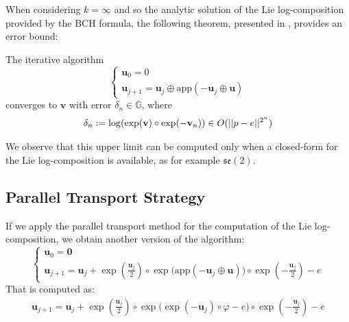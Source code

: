 When considering $k = \infty$ and so the analytic solution of the Lie log-composition provided by the BCH formula, the following theorem, presented in \cite{Bossa:08}, provides an error bound:
\begin{theorem}[Bossa]\label{th:bossa}
	The iterative algorithm 
	\begin{equation}
	\begin{cases}
	\mathbf{u}_0 = 0 \\
	\mathbf{u}_{j+1} %
	                          = \mathbf{u}_{j} \oplus  \text{app}(-\mathbf{u}_{j}  \oplus  \mathbf{u} )
	\end{cases}
	\end{equation}
	converges to $\mathbf{v}$ with error $\delta_n \in \mathbb{G}$, where
	\begin{align*}
	\delta_{n} := \log(\exp(\mathbf{v})\circ \exp(-\mathbf{v}_{n})) \in O(\vert\lvert p - e \rvert\vert^{2^{n}})
	\end{align*}
\end{theorem}

We observe that this upper limit can be computed only when a closed-form for the Lie log-composition is available, as for example $\mathfrak{se}(2)$.

\subsection{Parallel Transport Strategy}

If we apply the parallel transport method for the computation of the Lie log-composition, we obtain another version of the algorithm:
\begin{equation}\label{eq:bossa_parallel_strategy}
\begin{cases}
\mathbf{u}_0 = \mathbf{0} \\
\mathbf{u}_{j+1} 
= 
\mathbf{u}_{j} 
+ 
\exp(\frac{\mathbf{u}_{j}}{2}) \circ \exp\Big(   \text{app}(-\mathbf{u}_{j}  \oplus  \mathbf{u} ) \Big)
\circ 
\exp(-\frac{\mathbf{u}_{j}}{2}) - e
\end{cases}
\end{equation}
That is computed as:
\begin{align*}
\mathbf{u}_{j+1} 
= 
\mathbf{u}_{j} 
+ 
\exp(\frac{\mathbf{u}_{j}}{2}) \circ \exp\Big(   \exp(-\mathbf{u}_{j}) \circ\varphi  - e \Big)
\circ 
\exp(-\frac{\mathbf{u}_{j}}{2}) - e
\end{align*}

